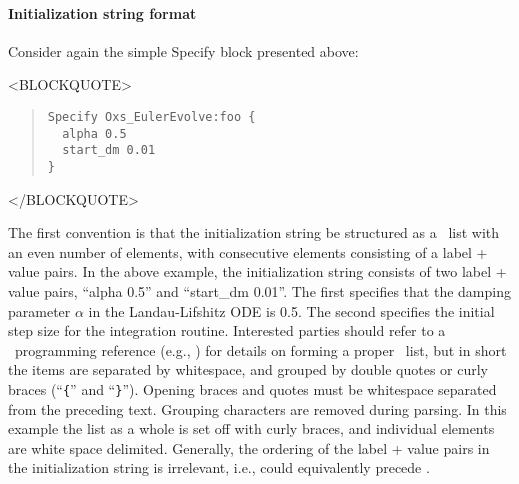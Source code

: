 \paragraph{Initialization string format}%
\label{par:specInitString}
Consider again the simple Specify block presented above:
\begin{rawhtml}<BLOCKQUOTE>\end{rawhtml}
\begin{quote}
\begin{verbatim}
Specify Oxs_EulerEvolve:foo {
  alpha 0.5
  start_dm 0.01
}
\end{verbatim}
\end{quote}
\begin{rawhtml}</BLOCKQUOTE>\end{rawhtml}
The first convention is that the initialization string be structured as
a \Tcl\ list with an even number of elements, with
consecutive elements consisting of a label + value pairs.  In the above
example, the initialization string consists of two label + value pairs,
``alpha 0.5'' and ``start\_dm 0.01''.  The first specifies that the
damping parameter $\alpha$ in the Landau-Lifshitz ODE is 0.5.  The
second specifies the initial step size for the integration routine.
Interested parties should refer to a \Tcl\ programming reference (e.g.,
\cite{welch00}) for details on forming a proper \Tcl\ list, but in short
the items are separated by whitespace, and grouped by double quotes or
curly braces (``\verb+{+'' and ``\verb+}+'').  Opening braces and quotes
must be whitespace separated from the preceding text.  Grouping
characters are removed during parsing.  In this example the list as a
whole is set off with curly braces, and individual elements are white
space delimited.  Generally, the ordering of the label + value pairs in
the initialization string is irrelevant, i.e.,  could
equivalently precede .


